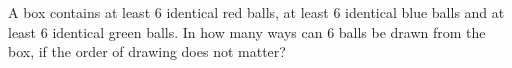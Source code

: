 A box contains at least $6$ identical red balls, at least $6$ identical blue balls and at least $6$ identical green balls. In how many ways can $6$ balls be drawn from the box, if the order of drawing does not matter?
